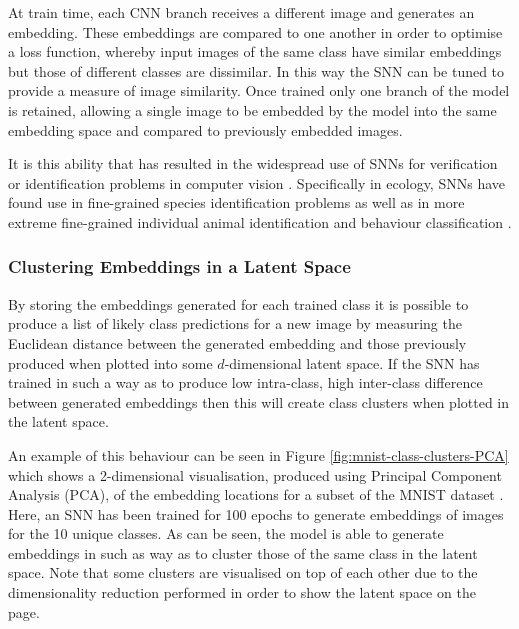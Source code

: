 At train time, each CNN branch receives a different image and generates an embedding. These embeddings are compared to one another in order to optimise a loss function, whereby input images of the same class have similar embeddings but those of different classes are dissimilar. In this way the SNN can be tuned to provide a measure of image similarity. Once trained only one branch of the model is retained, allowing a single image to be embedded by the model into the same embedding space and compared to previously embedded images.

It is this ability that has resulted in the widespread use of SNNs for verification or identification problems in computer vision \cite{dey_signet_2017, wang_discriminative_2020}. Specifically in ecology, SNNs have found use in fine-grained species identification problems \cite{vetrova_hidden_2018, araujo_two-view_2022} as well as in more extreme fine-grained individual animal identification \cite{clapham_automated_2020} and behaviour classification \cite{brookes_triple-stream_2023}. 

\subsubsection{Clustering Embeddings in a Latent Space}\label{ch:ID,sec:deciding,sub:SNN,subsub:ClusteringEmbeddings}

By storing the embeddings generated for each trained class it is possible to produce a list of likely class predictions for a new image by measuring the Euclidean distance between the generated embedding and those previously produced when plotted into some $d$-dimensional latent space. If the SNN has trained in such a way as to produce low intra-class, high inter-class difference between generated embeddings then this will create class clusters when plotted in the latent space. 

An example of this behaviour can be seen in Figure \ref{fig:mnist-class-clusters-PCA} which shows a 2-dimensional visualisation, produced using Principal Component Analysis (PCA), of the embedding locations for a subset of the MNIST dataset \cite{lecun_gradient-based_1998}. Here, an SNN has been trained for 100 epochs to generate embeddings of images for the 10 unique classes. As can be seen, the model is able to generate embeddings in such as way as to cluster those of the same class in the latent space. Note that some clusters are visualised on top of each other due to the dimensionality reduction performed in order to show the latent space on the page. 

